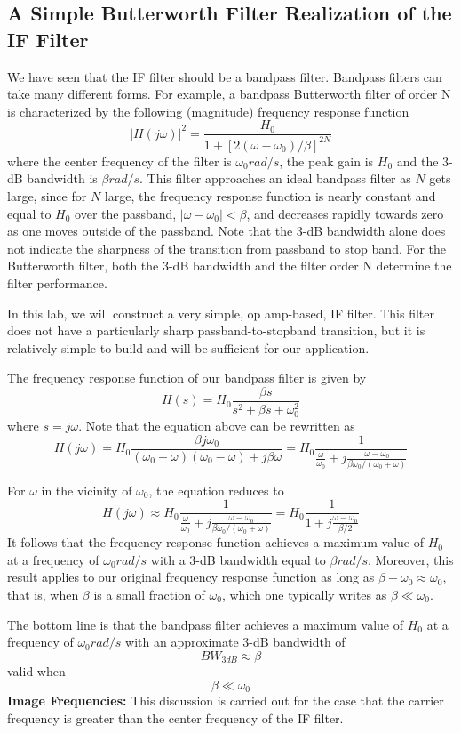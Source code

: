 \documentclass [utf8] {article}
\begin{document}
\subsection{A Simple Butterworth Filter Realization of the IF Filter}
{
	We have seen that the IF filter should be a bandpass filter. Bandpass filters can take many different forms. For example, a bandpass Butterworth filter of order N is characterized by the following (magnitude) frequency response function
	$$|H(j\omega)|^2 = \frac{H_0}{1+[2(\omega-\omega_0)/\beta]^{2N}}$$
	where the center frequency of the filter is $\omega_0 rad/s$, the peak gain is $H_0$ and the 3-dB bandwidth is $\beta rad/s$. This filter approaches an ideal bandpass filter as $N$ gets large, since for $N$ large, the frequency response function is nearly constant and equal to $H_0$ over the passband, $|\omega − \omega_0| < \beta$, and decreases rapidly towards zero as one moves outside of the passband. Note that the 3-dB bandwidth alone does not indicate the sharpness of the transition from passband to stop band. For the Butterworth filter, both the 3-dB bandwidth and the filter order N determine the filter performance.

	In this lab, we will construct a very simple, op amp-based, IF filter. This filter does not have a particularly sharp passband-to-stopband transition, but it is relatively simple to build and will be sufficient for our application.

	The frequency response function of our bandpass filter is given by
	$$H(s) = H_0\frac{\beta s}{s^2+\beta s+\omega_0^2}$$
	where $s = j\omega$. Note that the equation above can be rewritten as
	$$H(j\omega) = H_0\frac{\beta j \omega_0}{(\omega_0+\omega)(\omega_0-\omega)+j\beta\omega} = H_0\frac{1}{\frac{\omega}{\omega_0}+j\frac{\omega-\omega_0}{\beta\omega_0/(\omega_0+\omega)}}$$

	For $\omega$ in the vicinity of $\omega_0$, the equation reduces to
	$$H(j\omega)\approx H_0\frac{1}{\frac{\omega}{\omega_0}+j\frac{\omega-\omega_0}{\beta\omega_0/(\omega_0+\omega)}} = H_0\frac{1}{1+j\frac{\omega-\omega_0}{\beta/2}}$$
	It follows that the frequency response function achieves a maximum value of $H_0$ at a frequency of $\omega_0 rad/s$ with a 3-dB bandwidth equal to $\beta rad/s$. Moreover, this result applies to our original frequency response function as long as $\beta + \omega_0\approx\omega_0$, that is, when $\beta$ is a small fraction of $\omega_0$, which one typically writes as $\beta\ll\omega_0$.

	The bottom line is that the bandpass filter achieves a maximum value of $H_0$ at a frequency of $\omega_0 rad/s$ with an approximate 3-dB bandwidth of
	$$BW_{3dB}\approx\beta$$
	valid when
	$$\beta\ll\omega_0$$
	\textbf{Image Frequencies:}
	This discussion is carried out for the case that the carrier frequency is greater than the center frequency of the IF filter.

}
\end{document}
